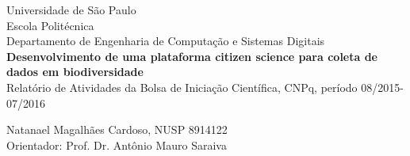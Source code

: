 \begin{titlepage}
  \begin{center}
    Universidade de São Paulo\\
    Escola Politécnica\\
    Departamento de Engenharia de Computação e Sistemas Digitais\\

    \vfill
    \large
    \textbf{Desenvolvimento de uma plataforma citizen science para coleta de dados em biodiversidade}\\
    \vspace{.6cm}
    Relatório de Atividades da Bolsa de Iniciação Científica, CNPq, período 08/2015-07/2016

    \vfill
    Natanael Magalhães Cardoso, NUSP 8914122\\
    {\normalsize Orientador:} Prof. Dr. Antônio Mauro Saraiva
    \vspace{2cm}
  \end{center}
\end{titlepage}
